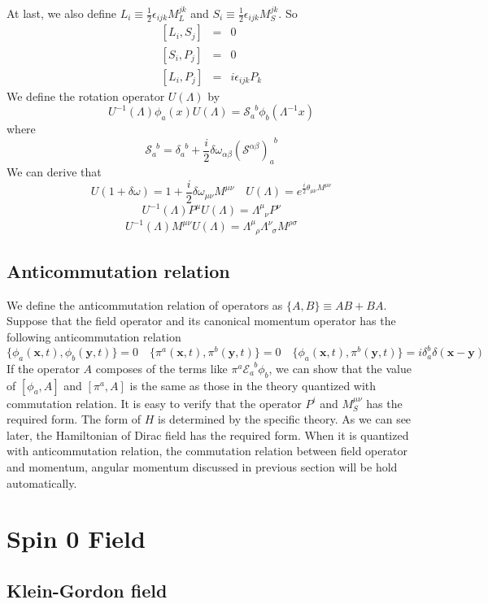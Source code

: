 At last, we also define $L_i \equiv \frac{1}{2} \epsilon_{ijk} M_L^{jk}$ and $S_i \equiv \frac{1}{2} \epsilon_{ijk} M_S^{jk}$. So
\begin{eqnarray}
\left[L_i,S_j\right] &=& 0 \nonumber \\
\left[S_i,P_j\right] &=& 0 \nonumber \\
\left[L_i,P_j\right] &=& i\epsilon_{ijk}P_k \nonumber
\end{eqnarray}
We define the rotation operator $U(\Lambda)$ by
\[U^{-1}(\Lambda) \phi_a(x) U(\Lambda) = \mathscr{S}_{a}^{\phantom{a}b}\phi_b(\Lambda^{-1}x)\]
where
\[\mathscr{S}_{a}^{\phantom{a}b} = \delta_{a}^{\phantom{a}b}+\frac{i}{2} \delta \omega_{\alpha \beta} (\mathcal{S}^{\alpha \beta})_{a}^{\phantom{a}b} \]
We can derive that
\[U(1+\delta \omega) = 1 + \frac{i}{2} \delta \omega_{\mu \nu} M^{\mu \nu} \quad U(\Lambda) = e^{\frac{i}{2} \theta_{\mu \nu} M^{\mu \nu}}\]
\[U^{-1}(\Lambda) P^{\mu} U(\Lambda) = \Lambda^{\mu}_{\phantom{\mu}\nu} P^{\nu}\]
\[U^{-1}(\Lambda) M^{\mu \nu} U(\Lambda) = \Lambda^{\mu}_{\phantom{\mu}\rho} \Lambda^{\nu}_{\phantom{\nu}\sigma}M^{\rho \sigma}\]

\section{Anticommutation relation}
\noindent
We define the anticommutation relation of operators as $\{A,B\} \equiv AB + BA$. Suppose that the field operator and its canonical momentum operator has the following anticommutation relation
\[\{\phi_a(\bm{x},t),\phi_b(\bm{y},t)\} = 0 \quad \{\pi^a(\bm{x},t),\pi^b(\bm{y},t)\} = 0 \quad \{\phi_a(\bm{x},t),\pi^b(\bm{y},t)\} = i \delta_a^b \delta(\bm{x}-\bm{y}) \]
If the operator $A$ composes of the terms like $\pi^a \mathcal{E}_a^{\phantom{a}b} \phi_b$, we can show that the value of $[\phi_a,A]$ and $[\pi^a,A]$ is the same as those in the theory quantized with commutation relation. It is easy to verify that the operator $P^i$ and $M_S^{\mu \nu}$ has the required form. The form of $H$ is determined by the specific theory. As we can see later, the Hamiltonian of Dirac field  has the required form. When it is quantized with anticommutation relation, the commutation relation between field operator and momentum, angular momentum discussed in previous section will be hold automatically. 

\chapter{Spin 0 Field}
\section{Klein-Gordon field}
